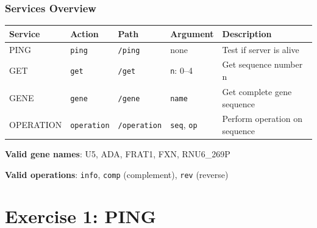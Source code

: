 \documentclass[xcolor=table]{beamer}
\begin{document}
\begin{frame}
\frametitle{Services Overview}

\begingroup\small
\begin{center}
\begin{tabular}{|l|l|l|l|p{2.5cm}|}
\hline
\textbf{Service} & \textbf{Action} & \textbf{Path} & \textbf{Argument} & \textbf{Description} \\
\hline
PING & \texttt{ping} & \texttt{/ping} & none & Test if server is alive \\
\hline
GET & \texttt{get} & \texttt{/get} & \texttt{n}: 0--4 & Get sequence number n \\
\hline
GENE & \texttt{gene} & \texttt{/gene} & \texttt{name} & Get complete gene sequence \\
\hline
OPERATION & \texttt{operation} & \texttt{/operation} & \texttt{seq}, \texttt{op} & Perform operation on sequence \\
\hline
\end{tabular}
\end{center}
\endgroup

\vspace{0.2cm}

\textbf{Valid gene names}: U5, ADA, FRAT1, FXN, RNU6\_269P

\vspace{0.2cm}

\textbf{Valid operations}: \texttt{info}, \texttt{comp} (complement), \texttt{rev} (reverse)

\end{frame}


\section{Exercise 1: PING}
\end{document}
